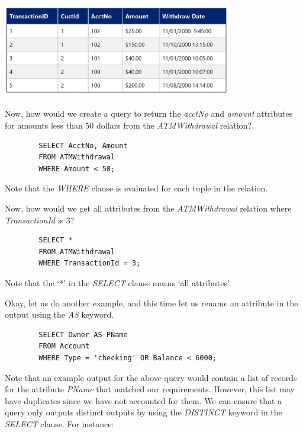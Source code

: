 \documentclass{article}
\begin{document}
\includegraphics[width=10cm]{assets/ATMWithdrawalExample.png}

Now, how would we create a query to return the \textit{acctNo} and \textit{amount} attributes for amounts less than 50 dollars from the \textit{ATMWithdrawal} relation?

\begin{tcolorbox}
    \begin{verbatim}
        SELECT AcctNo, Amount
        FROM ATMWithdrawal
        WHERE Amount < 50;
    \end{verbatim}
\end{tcolorbox}
Note that the \textit{WHERE} clause is evaluated for each tuple in the relation.

Now, how would we get all attributes from the \textit{ATMWithdrawal} relation where \textit{TransactionId} is 3?

\begin{tcolorbox}
    \begin{verbatim}
        SELECT *
        FROM ATMWithdrawal
        WHERE TransactionId = 3;
    \end{verbatim}
\end{tcolorbox}
Note that the `*' in the \textit{SELECT} clause means `all attributes'

Okay, let us do another example, and this time let us rename an attribute in the output using the \textit{AS} keyword.

\begin{tcolorbox}
    \begin{verbatim}
        SELECT Owner AS PName
        FROM Account
        WHERE Type = 'checking' OR Balance < 6000;
    \end{verbatim}
\end{tcolorbox}

Note that an example output for the above query would contain a list of records for the attribute \textit{PName} that matched our requirements. However, this list may have duplicates since we have not accounted for them. We can ensure that a query only outputs distinct outputs by using the \textit{DISTINCT} keyword in the \textit{SELECT} clause. For instance:
\end{document}
